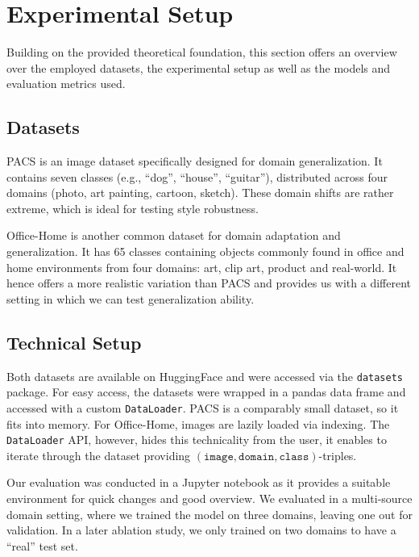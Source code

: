 \section{Experimental Setup}\label{sec:setup}

Building on the provided theoretical foundation, this section offers an overview over the employed datasets, the experimental setup as well as the models and evaluation metrics used.

\subsection{Datasets}

PACS \citep{liDeeperBroaderArtier2017} is an image dataset specifically designed for domain generalization. It contains seven classes (e.g., ``dog'', ``house'', ``guitar''), distributed across four domains (photo, art painting, cartoon, sketch). These domain shifts are rather extreme, which is ideal for testing style robustness.

Office-Home \citep{venkateswaraDeepHashingNetwork2017} is another common dataset for domain adaptation and generalization. It has 65 classes containing objects commonly found in office and home environments from four domains: art, clip art, product and real-world. It hence offers a more realistic variation than PACS and provides us with a different setting in which we can test generalization ability.

\subsection{Technical Setup}

Both datasets are available on HuggingFace and were accessed via the \lstinline|datasets| package. For easy access, the datasets were wrapped in a pandas data frame and accessed with a custom \lstinline|DataLoader|. PACS is a comparably small dataset, so it fits into memory. For Office-Home, images are lazily loaded via indexing. The \lstinline|DataLoader| API, however, hides this technicality from the user, it enables to iterate through the dataset providing $(\mathtt{image}, \mathtt{domain}, \mathtt{class})$-triples.

Our evaluation was conducted in a Jupyter notebook as it provides a suitable environment for quick changes and good overview. We evaluated in a multi-source domain setting, where we trained the model on three domains, leaving one out for validation. In a later ablation study, we only trained on two domains to have a ``real'' test set.

